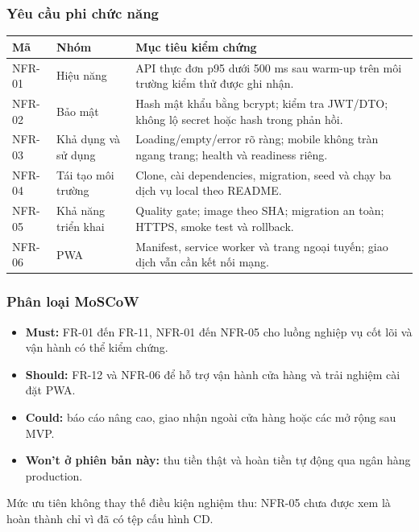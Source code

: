 \documentclass[12pt,a4paper]{article}
\begin{document}
\subsubsection{Yêu cầu phi chức năng}
\begin{longtable}{P{1.5cm}P{3.2cm}P{9.9cm}}
\toprule\textbf{Mã}&\textbf{Nhóm}&\textbf{Mục tiêu kiểm chứng}\\\midrule\endhead
NFR-01&Hiệu năng&API thực đơn p95 dưới 500 ms sau warm-up trên môi trường kiểm thử được ghi nhận.\\
NFR-02&Bảo mật&Hash mật khẩu bằng bcrypt; kiểm tra JWT/DTO; không lộ secret hoặc hash trong phản hồi.\\
NFR-03&Khả dụng và sử dụng&Loading/empty/error rõ ràng; mobile không tràn ngang trang; health và readiness riêng.\\
NFR-04&Tái tạo môi trường&Clone, cài dependencies, migration, seed và chạy ba dịch vụ local theo README.\\
NFR-05&Khả năng triển khai&Quality gate; image theo SHA; migration an toàn; HTTPS, smoke test và rollback.\\
NFR-06&PWA&Manifest, service worker và trang ngoại tuyến; giao dịch vẫn cần kết nối mạng.\\
\bottomrule
\end{longtable}

\subsubsection{Phân loại MoSCoW}
\begin{itemize}
\item \textbf{Must:} FR-01 đến FR-11, NFR-01 đến NFR-05 cho luồng nghiệp vụ cốt lõi và vận hành có thể kiểm chứng.
\item \textbf{Should:} FR-12 và NFR-06 để hỗ trợ vận hành cửa hàng và trải nghiệm cài đặt PWA.
\item \textbf{Could:} báo cáo nâng cao, giao nhận ngoài cửa hàng hoặc các mở rộng sau MVP.
\item \textbf{Won't ở phiên bản này:} thu tiền thật và hoàn tiền tự động qua ngân hàng production.
\end{itemize}
Mức ưu tiên không thay thế điều kiện nghiệm thu: NFR-05 chưa được xem là hoàn thành chỉ vì đã có tệp cấu hình CD.
\end{document}
